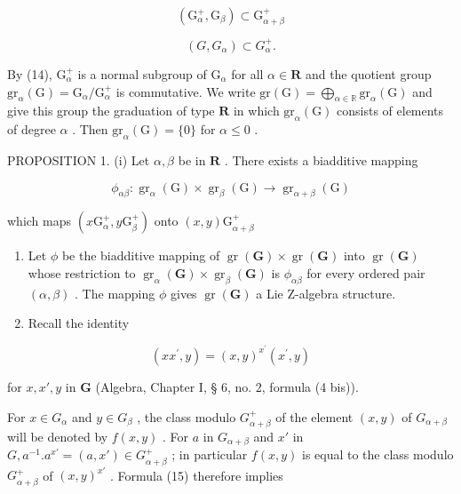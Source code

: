 \[
\left(\mathrm{G} _ {\alpha} ^ {+}, \mathrm{G} _ {\beta}\right) \subset \mathrm{G} _ {\alpha + \beta} ^ {+}\tag{13'}
\]

\[
(G, G _ {\alpha}) \subset G _ {\alpha} ^ {+}.\tag{14}
\]

By (14), \(\mathrm{G}_{\alpha}^{+}\) is a normal subgroup of \(\mathrm{G}_{\alpha}\) for all \(\alpha \in \mathbf{R}\) and the quotient group \(\mathrm{gr}_{\alpha}(\mathrm{G}) = \mathrm{G}_{\alpha} / \mathrm{G}_{\alpha}^{+}\) is commutative. We write \(\mathrm{gr}(\mathrm{G}) = \bigoplus_{\alpha \in \mathbb{R}}\mathrm{gr}_{\alpha}(\mathrm{G})\) and give this group the graduation of type \(\mathbf{R}\) in which \(\mathrm{gr}_{\alpha}(\mathrm{G})\) consists of elements of degree \(\alpha\) . Then \(\mathrm{gr}_{\alpha}(\mathrm{G}) = \{0\}\) for \(\alpha \leqslant 0\) .

PROPOSITION 1. (i) Let \(\alpha, \beta\) be in \(\mathbf{R}\) . There exists a biadditive mapping

\[
\phi_ {\alpha \beta}: \operatorname{gr} _ {\alpha} (\mathrm{G}) \times \operatorname{gr} _ {\beta} (\mathrm{G}) \rightarrow \operatorname{gr} _ {\alpha + \beta} (\mathrm{G})
\]

which maps \((x\mathrm{G}_{\alpha}^{+},y\mathrm{G}_{\beta}^{+})\) onto \((x,y)\mathrm{G}_{\alpha +\beta}^{+}\)

\begin{enumerate}
\def\labelenumi{(\roman{enumi})}
\setcounter{enumi}{1}
\item
  Let \(\phi\) be the biadditive mapping of \(\operatorname{gr}(\mathbf{G}) \times \operatorname{gr}(\mathbf{G})\) into \(\operatorname{gr}(\mathbf{G})\) whose restriction to \(\operatorname{gr}_{\alpha}(\mathbf{G}) \times \operatorname{gr}_{\beta}(\mathbf{G})\) is \(\phi_{\alpha \beta}\) for every ordered pair \((\alpha, \beta)\) . The mapping \(\phi\) gives \(\operatorname{gr}(\mathbf{G})\) a Lie Z-algebra structure.
\item
  Recall the identity
\end{enumerate}

\[
(x x ^ {\prime}, y) = (x, y) ^ {x ^ {\prime}} \left(x ^ {\prime}, y\right)\tag{15}
\]

for \(x, x', y\) in \(\mathbf{G}\) (Algebra, Chapter I, § 6, no. 2, formula (4 bis)).

For \(x \in G_{\alpha}\) and \(y \in G_{\beta}\) , the class modulo \(G_{\alpha + \beta}^{+}\) of the element \((x, y)\) of \(G_{\alpha + \beta}\) will be denoted by \(f(x, y)\) . For \(a\) in \(G_{\alpha + \beta}\) and \(x'\) in \(G, a^{-1}.a^{x'} = (a, x') \in G_{\alpha + \beta}^{+}\) ; in particular \(f(x, y)\) is equal to the class modulo \(G_{\alpha + \beta}^{+}\) of \((x, y)^{x'}\) . Formula (15) therefore implies

